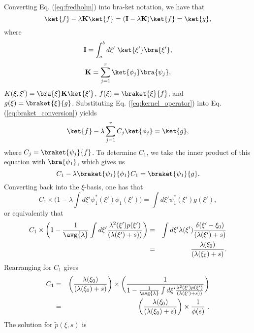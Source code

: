 Converting Eq. (\ref{eq:fredholm}) into bra-ket notation, we have that
\begin{equation}
\ket{f} - \lambda \textbf{K} \ket{f} = (\textbf{I} - \lambda \textbf{K}) \ket{f} = \ket{g}, \label{eq:braket_conversion}
\end{equation}
where 
\begin{equation}
\textbf{I} = \int_{a}^{b} d \xi'~\ket{\xi'} \bra{\xi'}, \nonumber
\end{equation}
\begin{equation}
\textbf{K} = \sum_{j=1}^{r} \ket{\phi_j} \bra{\psi_j}, \label{eq:kernel_operator}
\end{equation}
$K(\xi, \xi') = \bra{\xi} \textbf{K} \ket{\xi'}$, $f(\xi) = \braket{\xi}{f}$, and $g(\xi) = \braket{\xi}{g}$. Substituting Eq. (\ref{eq:kernel_operator}) into Eq. (\ref{eq:braket_conversion}) yields
\begin{equation}
\ket{f} - \lambda \sum_{j=1}^{r} C_j \ket{\phi_j} = \ket{g}, \nonumber
\end{equation}
where $C_j = \braket{\psi_j}{f}$. To determine $C_1$, we take the inner product of this equation with $\bra{\psi_1}$, which gives us
\begin{equation}
C_1 - \lambda \braket{\psi_1}{\phi_1} C_1 = \braket{\psi_1}{g}. \nonumber
\end{equation}
Converting back into the $\xi$-basis, one has that
\begin{equation}
C_1\times \bigg( 1 - \lambda \int d \xi' \psi^*_1(\xi')\phi_1(\xi') \bigg) = \int d \xi' \psi^*_1(\xi') g(\xi'), \nonumber
\end{equation}
or equivalently that
\begin{eqnarray}
C_1\times \bigg( 1 - \frac{1}{\avg{\lambda}} \int d \xi' \frac{\lambda^2(\xi') p(\xi')}{(\lambda(\xi')+s))} \bigg) &=& \int d \xi' \lambda(\xi') \frac{\delta(\xi'-\xi_0)}{(\lambda(\xi')+s)} \nonumber \\
&=& \frac{\lambda(\xi_0) }{(\lambda(\xi_0)+s)}. \nonumber
\end{eqnarray}
Rearranging for $C_1$ gives
\begin{eqnarray}
C_1 &=& \bigg(\frac{\lambda(\xi_0) }{(\lambda(\xi_0)+s)}\bigg) \times \bigg( \frac{1}{ 1 - \frac{1}{\avg{\lambda}} \int d \xi' \frac{\lambda^2(\xi') p(\xi')}{(\lambda(\xi')+s))}} \bigg) \\
&=& \bigg(\frac{\lambda(\xi_0) }{(\lambda(\xi_0)+s)}\bigg) \times \frac{1}{\phi(s)}~.
\end{eqnarray}
The solution for $\tilde{p}(\xi, s)$ is
